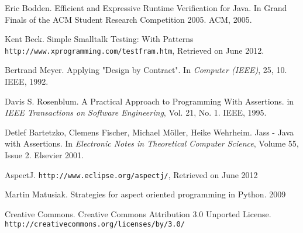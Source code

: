 \documentclass[a4paper,11pt]{article}
\begin{document}
\begin{thebibliography}{99}
	Eric Bodden.
	Efficient and Expressive Runtime Verification for Java.
	In Grand Finals of the ACM Student Research Competition 2005.
	ACM, 2005.

	Kent Beck.
	Simple Smalltalk Testing: With Patterns
	\texttt{http://www.xprogramming.com/testfram.htm},
	Retrieved on June 2012.

	Bertrand Meyer.
	Applying "Design by Contract".
	In \emph{Computer (IEEE)}, 25, 10.
	IEEE, 1992.
	
	Davis S. Rosenblum.
	A Practical Approach to Programming With Assertions.
	in \emph{IEEE Transactions on Software Engineering}, Vol. 21, No. 1.
	IEEE, 1995.

	Detlef Bartetzko, Clemens Fischer, Michael Möller, Heike Wehrheim.
	Jass - Java with Assertions.
	In \emph{Electronic Notes in Theoretical Computer Science}, Volume 55, Issue 2.
	Elsevier 2001.

	AspectJ.
	\texttt{http://www.eclipse.org/aspectj/},
	Retrieved on June 2012

	Martin Matusiak.
	Strategies for aspect oriented programming in Python.
	2009

	Creative Commons.
	Creative Commons Attribution 3.0 Unported License.
	\texttt{http://creativecommons.org/licenses/by/3.0/}

\end{thebibliography}
\end{document}
